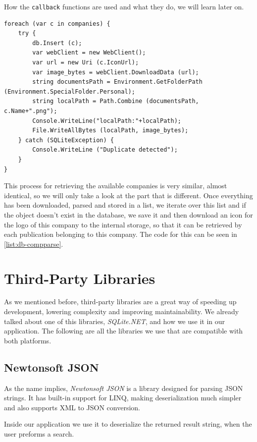 How the \texttt{callback} functions are used and what they do, we will learn later on.

\begin{lstlisting}[frame=lt,caption=CompaniesParser.cs,label={list:db-compparse}]
foreach (var c in companies) {
	try {
		db.Insert (c);
		var webClient = new WebClient();
		var url = new Uri (c.IconUrl);
		var image_bytes = webClient.DownloadData (url);
		string documentsPath = Environment.GetFolderPath (Environment.SpecialFolder.Personal);	
		string localPath = Path.Combine (documentsPath, c.Name+".png");
		Console.WriteLine("localPath:"+localPath);
		File.WriteAllBytes (localPath, image_bytes);		
	} catch (SQLiteException) {
		Console.WriteLine ("Duplicate detected");					
	}
}
\end{lstlisting}

This process for retrieving the available companies is very similar, almost identical, so we will only take a look at the part that is different. Once everything has been downloaded, parsed and stored in a list, we iterate over this list and if the object doesn't exist in the database, we save it and then download an icon for the logo of this company to the internal storage, so that it can be retrieved by each publication belonging to this company. The code for this can be seen in \autoref{list:db-compparse}.

\section{Third-Party Libraries}

As we mentioned before, third-party libraries are a great way of speeding up development, lowering complexity and improving maintainability. We already talked about one of this libraries, \textit{SQLite.NET}, and how we use it in our application. The following are all the libraries we use that are compatible with both platforms. 

\subsection{Newtonsoft JSON}

As the name implies, \textit{Newtonsoft JSON} is a library designed for parsing \ac{JSON} strings. It has built-in support for \ac{LINQ}, making deserialization much simpler and also supports \ac{XML} to \ac{JSON} conversion.

Inside our application we use it to deserialize the returned result string, when the user preforms a search.


